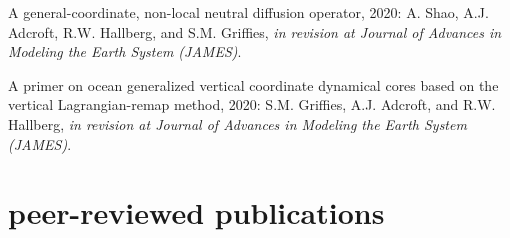 \begin{etaremune}
\item A general-coordinate, non-local neutral diffusion operator, 2020: A. Shao, A.J. Adcroft, R.W. Hallberg, and S.M. Grif\/f\/ies, {\it in revision at Journal of Advances in Modeling the Earth System (JAMES)}.

\item A primer on ocean generalized vertical coordinate dynamical cores based on the vertical Lagrangian-remap method, 2020: S.M. Grif\/f\/ies, A.J. Adcroft, and R.W. Hallberg, {\it in revision at Journal of Advances in Modeling the Earth System (JAMES)}.


\end{etaremune}


\section*{\sc \color{Maroon} peer-reviewed publications}

\small 

